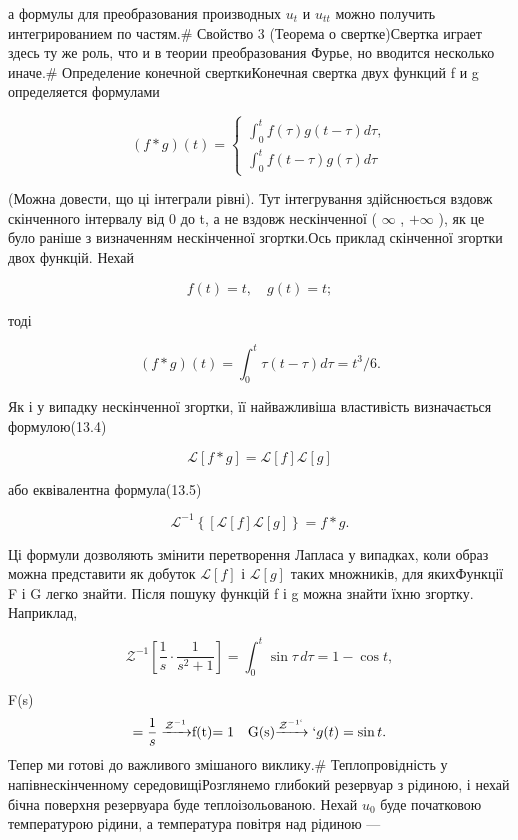 \documentclass[
  ukrainian,
]{article}
\begin{document}
а формулы для преобразования производных \(u_t\) и \(u_{tt}\) можно
получить интегрированием по частям.\# Свойство 3 (Теорема о
свертке)Свертка играет здесь ту же роль, что и в теории преобразования
Фурье, но вводится несколько иначе.\# Определение конечной
сверткиКонечная свертка двух функций f и g определяется формулами

\[
(f * g) (t) =
\begin{cases} \int_0^t f(\tau) g(t-\tau) d\tau, \\ \int_0^t f(t-\tau) g(\tau) d\tau \end{cases}
\]

(Можна довести, що ці інтеграли рівні). Тут інтегрування здійснюється
вздовж скінченного інтервалу від 0 до t, а не вздовж нескінченної (
\(\infty\) , \(+\infty\) ), як це було раніше з визначенням нескінченної
згортки.Ось приклад скінченної згортки двох функцій. Нехай

\[
f(t) = t, \quad g(t) = t;
\]

тоді

\[
(f * g)(t) = \int_{0}^{t} \tau(t - \tau) d\tau = t^{3}/6.
\]

Як і у випадку нескінченної згортки, її найважливіша властивість
визначається формулою(13.4)

\[
\mathscr{L}[f * g] = \mathscr{L}[f] \mathscr{L}[g]
\]

або еквівалентна формула(13.5)

\[
\mathscr{L}^{-1}\left\{ \left[\mathscr{L}\left[f\right]\mathscr{L}\left[g\right]\right\} = f*g. \right.
\]

Ці формули дозволяють змінити перетворення Лапласа у випадках, коли
образ можна представити як добуток \(\mathscr{L}[f]\) і
\(\mathscr{L}[g]\) таких множників, для якихФункції F і G легко знайти.
Після пошуку функцій f і g можна знайти їхню згортку. Наприклад,

\[
\mathcal{Z}^{-1}\left[\frac{1}{s} \cdot \frac{1}{s^2+1}\right] = \int_0^t \sin \tau \, d\tau = 1 - \cos t,
\]

F(s)\[= \frac{1}{s} \xrightarrow{\mathcal{Z}^{-1}} $f(t)$ = 1 \quad $G(s)$ \xrightarrow{\mathcal{Z}^{-1`}}`g(t) = \sin t.\]
Тепер ми готові до важливого змішаного виклику.\# Теплопровідність у
напівнескінченному середовищіРозглянемо глибокий резервуар з рідиною, і
нехай бічна поверхня резервуара буде теплоізольованою. Нехай \(u_0\)
буде початковою температурою рідини, а температура повітря над рідиною
---
\end{document}
